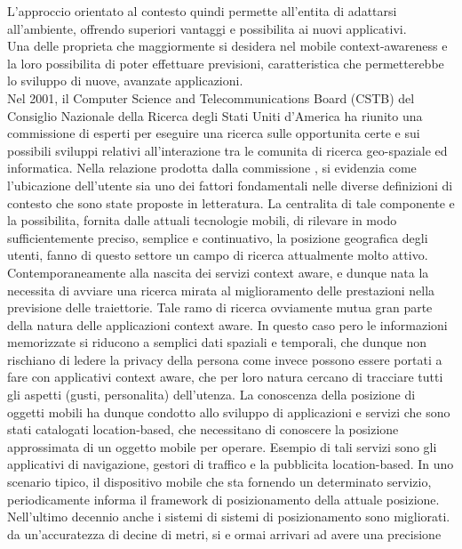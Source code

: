 L'approccio orientato al contesto quindi permette all'entita di adattarsi all'ambiente,
offrendo superiori vantaggi e possibilita ai nuovi applicativi.\\
Una delle proprieta che maggiormente si desidera nel mobile context-awareness
e la loro possibilita di poter effettuare previsioni, caratteristica che permetterebbe
lo sviluppo di nuove, avanzate applicazioni.\\
Nel 2001, il Computer Science and Telecommunications Board (CSTB) del
Consiglio Nazionale della Ricerca degli Stati Uniti d'America ha riunito una
commissione di esperti per eseguire una ricerca sulle opportunita certe e sui
possibili sviluppi relativi all'interazione tra le comunita di ricerca geo-spaziale
ed informatica. Nella relazione prodotta dalla commissione \cite{cit_47}, si evidenzia
come l'ubicazione dell'utente sia uno dei fattori fondamentali nelle diverse
definizioni di contesto che sono state proposte in letteratura. La centralita
di tale componente e la possibilita, fornita dalle attuali tecnologie mobili, di
rilevare in modo sufficientemente preciso, semplice e continuativo, la posizione
geografica degli utenti, fanno di questo settore un campo di ricerca attualmente
molto attivo.\\
Contemporaneamente alla nascita dei servizi context aware, e dunque nata
la necessita di avviare una ricerca mirata al miglioramento delle prestazioni
nella previsione delle traiettorie. Tale ramo di ricerca ovviamente mutua gran
parte della natura delle applicazioni context aware. In questo caso pero le
informazioni memorizzate si riducono a semplici dati spaziali e temporali, che
dunque non rischiano di ledere la privacy della persona come invece possono
essere portati a fare con applicativi context aware, che per loro natura cercano
di tracciare tutti gli aspetti (gusti, personalita) dell'utenza. La conoscenza della
posizione di oggetti mobili ha dunque condotto allo sviluppo di applicazioni
e servizi che sono stati catalogati location-based, che necessitano di conoscere
la posizione approssimata di un oggetto mobile per operare. Esempio di tali
servizi sono gli applicativi di navigazione, gestori di traffico e la pubblicita
location-based. In uno scenario tipico, il dispositivo mobile che sta fornendo
un determinato servizio, periodicamente informa il framework di posizionamento
della attuale posizione.\\
Nell'ultimo decennio anche i sistemi di sistemi di posizionamento sono migliorati.
da un'accuratezza di decine di metri, si e ormai arrivari ad avere una precisione
